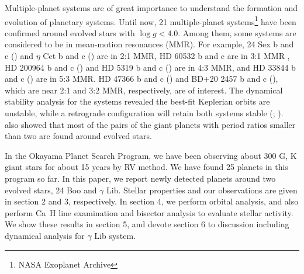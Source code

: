 \documentclass[]{pasj01}
\begin{document}
Multiple-planet systems are of great importance to understand the formation and evolution of planetary systems.
Until now, 21 multiple-planet systems\footnote{NASA Exoplanet Archive} have been confirmed around evolved stars with $\log g<4.0$.
Among them, some systems are considered to be in mean-motion resonances (MMR).
For example, 24 Sex b and c (\cite{Johnson2011}) and $\eta$ Cet b and c (\cite{Trifonov2014}) are in 2:1 MMR, HD 60532 b and c are in 3:1 MMR \citep{Desort2008}, HD 200964 b and c (\cite{Johnson2011}) and HD 5319 b and c (\cite{Giguere2015}) are in 4:3 MMR, and HD 33844 b and c (\cite{Wittenmyer2016}) are in 5:3 MMR. 
HD 47366 b and c (\cite{Sato2016}) and BD+20 2457 b and c (\cite{Niedzielski2009}), which are near 2:1 and 3:2 MMR, respectively, are of interest.
The dynamical stability analysis for the systems revealed the best-fit Keplerian orbits are unstable, while a retrograde configuration will retain both systems stable (\cite{Horner2014}; \cite{Sato2016}).
\citet{Sato2016} also showed that most of the pairs of the giant planets with period ratios smaller than two are found around evolved stars.

In the Okayama Planet Search Program, we have been observing about 300 G, K giant stars for about 15 years by RV method.
We have found 25 planets in this program so far.
In this paper, we report newly detected planets around two evolved stars, 24 Boo and $\gamma$ Lib.
Stellar properties and our observations are given in section 2 and 3, respectively.
In section 4, we perform orbital analysis, and also perform Ca\, H line examination and bisector analysis to evaluate stellar activity.
We show these results in section 5, and devote section 6 to discussion including dynamical analysis for $\gamma$ Lib system.
\end{document}
